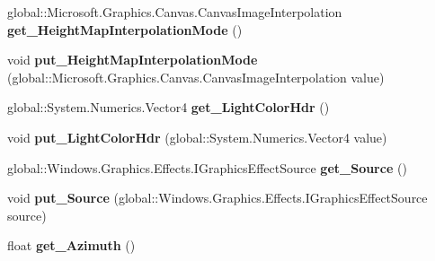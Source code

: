\begin{DoxyCompactItemize}
global\+::\+Microsoft.\+Graphics.\+Canvas.\+Canvas\+Image\+Interpolation {\bfseries get\+\_\+\+Height\+Map\+Interpolation\+Mode} ()
\item 
\mbox{\label{interface_microsoft_1_1_graphics_1_1_canvas_1_1_effects_1_1_i_distant_diffuse_effect_a6b663d3dc616764c53b170b9a03fbe9b}} 
void {\bfseries put\+\_\+\+Height\+Map\+Interpolation\+Mode} (global\+::\+Microsoft.\+Graphics.\+Canvas.\+Canvas\+Image\+Interpolation value)
\item 
\mbox{\label{interface_microsoft_1_1_graphics_1_1_canvas_1_1_effects_1_1_i_distant_diffuse_effect_a4ff1476fd89108a86f537334b15dcb06}} 
global\+::\+System.\+Numerics.\+Vector4 {\bfseries get\+\_\+\+Light\+Color\+Hdr} ()
\item 
\mbox{\label{interface_microsoft_1_1_graphics_1_1_canvas_1_1_effects_1_1_i_distant_diffuse_effect_a309009a35f74367a5df709977daacc4a}} 
void {\bfseries put\+\_\+\+Light\+Color\+Hdr} (global\+::\+System.\+Numerics.\+Vector4 value)
\item 
\mbox{\label{interface_microsoft_1_1_graphics_1_1_canvas_1_1_effects_1_1_i_distant_diffuse_effect_aecf1fa03d3dd124a0187bf585c4a6bff}} 
global\+::\+Windows.\+Graphics.\+Effects.\+I\+Graphics\+Effect\+Source {\bfseries get\+\_\+\+Source} ()
\item 
\mbox{\label{interface_microsoft_1_1_graphics_1_1_canvas_1_1_effects_1_1_i_distant_diffuse_effect_a1a3fd740e95528560a70b71705e67189}} 
void {\bfseries put\+\_\+\+Source} (global\+::\+Windows.\+Graphics.\+Effects.\+I\+Graphics\+Effect\+Source source)
\item 
\mbox{\label{interface_microsoft_1_1_graphics_1_1_canvas_1_1_effects_1_1_i_distant_diffuse_effect_a54a24baf03b3aaea4dd2da0b40209b87}} 
float {\bfseries get\+\_\+\+Azimuth} ()
\item 

\end{DoxyCompactItemize}
